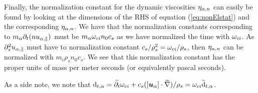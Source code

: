Finally, the normalization constant for the dynamic viscosities $\eta_{\alpha,n}$ can easily be found by looking at the dimensions of the RHS of equation (\ref{eq:nonElstat}) and the corresponding $\eta_{\alpha,n}$.
We have that the normalization constants corresponding to $m_\alpha \partial_t(nu_{\alpha,\|})$ must be $m_\alpha\omega_{ci}n_0c_s$ as we have normalized the time with $\omega_{ci}$.
As $\partial_z^2 u_{\alpha,\|}$ must have to normalization constant $c_s/\rho_s^2=\omega_{ci}/\rho_s$, then $\eta_{\alpha,n}$ can be normalized with $m_i\rho_s n_0c_s$.
We see that this normalization constant has the proper units of mass per meter seconds (or equivalently pascal seconds).

As a side note, we note that
$\text{d}_{t,\alpha} = \widetilde{ \partial_t}\omega_{ci} + c_s ([\boldsymbol{u}_\alpha]\cdot
    \widetilde{ \nabla})/{\rho_s} = \omega_{ci}\widetilde{ \text{d}}_{t,\alpha}$.

